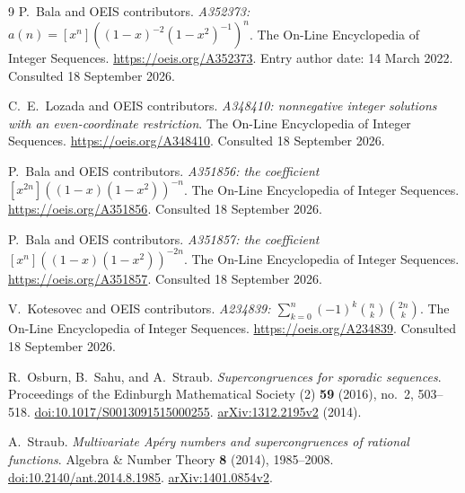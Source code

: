 \documentclass[11pt,a4paper]{article}
\numberwithin{equation}{section}
\theoremstyle{research}
\theoremstyle{definition}
\begin{document}
\clearpage
\begin{thebibliography}{9}
P.~Bala and OEIS contributors.
\emph{A352373: $a(n)=[x^n]((1-x)^{-2}(1-x^2)^{-1})^n$}.
The On-Line Encyclopedia of Integer Sequences.
\url{https://oeis.org/A352373}.
Entry author date: 14 March 2022. Consulted 18 September 2026.

C.~E.~Lozada and OEIS contributors.
\emph{A348410: nonnegative integer solutions with an even-coordinate
restriction}.
The On-Line Encyclopedia of Integer Sequences.
\url{https://oeis.org/A348410}. Consulted 18 September 2026.

P.~Bala and OEIS contributors.
\emph{A351856: the coefficient $[x^{2n}]((1-x)(1-x^2))^{-n}$}.
The On-Line Encyclopedia of Integer Sequences.
\url{https://oeis.org/A351856}. Consulted 18 September 2026.

P.~Bala and OEIS contributors.
\emph{A351857: the coefficient $[x^n]((1-x)(1-x^2))^{-2n}$}.
The On-Line Encyclopedia of Integer Sequences.
\url{https://oeis.org/A351857}. Consulted 18 September 2026.

V.~Kotesovec and OEIS contributors.
\emph{A234839: $\sum_{k=0}^n(-1)^k\binom nk\binom{2n}k$}.
The On-Line Encyclopedia of Integer Sequences.
\url{https://oeis.org/A234839}. Consulted 18 September 2026.

R.~Osburn, B.~Sahu, and A.~Straub.
\emph{Supercongruences for sporadic sequences}.
Proceedings of the Edinburgh Mathematical Society (2) \textbf{59}
(2016), no.~2, 503--518.
\href{https://doi.org/10.1017/S0013091515000255}{doi:10.1017/S0013091515000255}.
\href{https://arxiv.org/abs/1312.2195v2}{arXiv:1312.2195v2} (2014).

A.~Straub.
\emph{Multivariate Ap\'ery numbers and supercongruences of rational functions}.
Algebra \& Number Theory \textbf{8} (2014), 1985--2008.
\href{https://doi.org/10.2140/ant.2014.8.1985}{doi:10.2140/ant.2014.8.1985}.
\href{https://arxiv.org/abs/1401.0854v2}{arXiv:1401.0854v2}.
\end{thebibliography}
\end{document}

